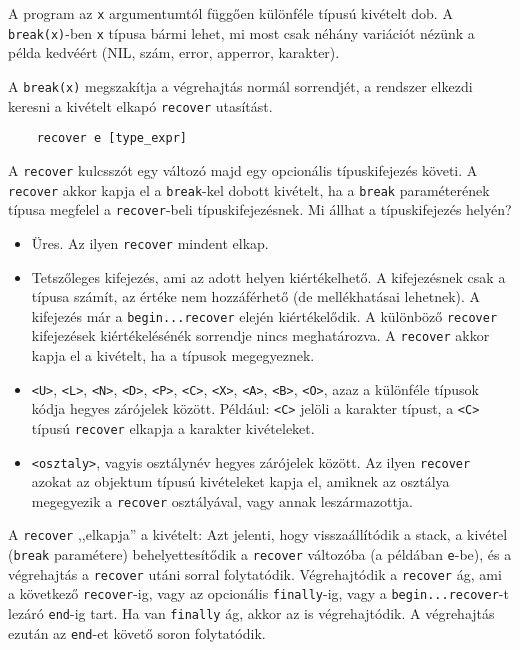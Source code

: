 A program az \verb!x! argumentumtól függően különféle típusú kivételt dob. 
A \verb!break(x)!-ben \verb!x! típusa bármi lehet, mi most csak néhány variációt 
nézünk a példa kedvéért (NIL, szám, error, apperror, karakter).

A \verb!break(x)! megszakítja a végrehajtás normál sorrendjét,
a rendszer elkezdi keresni a kivételt elkapó \verb!recover! utasítást.
\begin{verbatim}
    recover e [type_expr]
\end{verbatim}
A \verb!recover! kulcsszót egy változó majd egy opcionális típuskifejezés követi.
A \verb!recover! akkor kapja el a \verb!break!-kel dobott kivételt, ha a 
\verb!break! paraméterének típusa megfelel a \verb!recover!-beli típuskifejezésnek.
Mi állhat a típuskifejezés helyén?
\begin{itemize}
\item 
    Üres. Az ilyen \verb!recover! mindent elkap.
\item 
    Tetszőleges kifejezés, ami az adott helyen kiértékelhető.
    A kifejezésnek csak a típusa számít, az értéke
    nem hozzáférhető (de mellékhatásai lehetnek).
    A kifejezés már a \verb!begin...recover! elején kiértékelődik.
    A különböző \verb!recover! kifejezések kiértékelésénék sorrendje
    nincs meghatározva. A \verb!recover! akkor kapja el a kivételt,
    ha a típusok megegyeznek.
\item
    \verb!<U>!, 
    \verb!<L>!,
    \verb!<N>!,
    \verb!<D>!,
    \verb!<P>!,
    \verb!<C>!,
    \verb!<X>!,
    \verb!<A>!,
    \verb!<B>!,
    \verb!<O>!, azaz a különféle típusok kódja hegyes zárójelek között.
    Például: \verb!<C>! jelöli a karakter típust,  
    a \verb!<C>! típusú \verb!recover! elkapja a karakter kivételeket.
\item
    \verb!<osztaly>!, vagyis osztálynév hegyes zárójelek között. 
    Az ilyen \verb!recover! azokat az objektum típusú kivételeket kapja el, 
    amiknek az osztálya megegyezik a \verb!recover! osztályával, vagy 
    annak leszármazottja.
\end{itemize}

A \verb!recover! ,,elkapja'' a kivételt: Azt jelenti, 
hogy visszaállítódik a stack,
a kivétel (\verb!break! paramétere) behelyettesítődik a \verb!recover!
változóba (a példában \verb!e!-be), és a végrehajtás a \verb!recover! utáni
sorral folytatódik. Végrehajtódik a \verb!recover! ág, ami a következő 
\verb!recover!-ig, vagy az opcionális \verb!finally!-ig, 
vagy a \verb!begin...recover!-t lezáró \verb!end!-ig tart.
Ha van \verb!finally! ág, akkor az is végrehajtódik.
A végrehajtás ezután az \verb!end!-et követő soron folytatódik.


